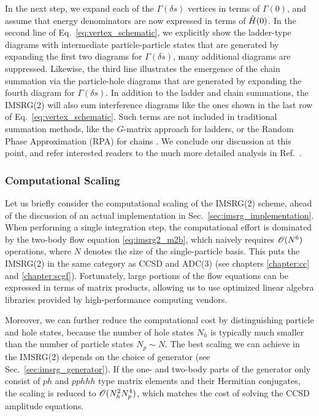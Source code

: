 {In the next step, we expand each of the $\Gamma(\delta s)$ vertices in
terms of $\Gamma(0)$, and assume that energy denominators are now
expressed in terms of $\hat{H}(0)$. In the second line of Eq.~\eqref{eq:vertex_schematic},
we explicitly show the ladder-type diagrams with intermediate 
particle-particle states that are generated by expanding
the first two diagrams for $\Gamma(\delta s)$, many additional diagrams
are suppressed. Likewise, the third line illustrates the emergence of 
the chain summation via the particle-hole diagrams that 
are generated by expanding the fourth diagram for $\Gamma(\delta s)$.
In addition to the ladder and chain summations, the IMSRG(2) will also
sum interference diagrams like the ones shown in the last row of 
Eq.~\eqref{eq:vertex_schematic}.
Such terms are not included in traditional summation methods, like
the $G$-matrix approach for ladders, or the Random Phase Approximation
(RPA) for chains \cite{Day:1967zl,Brandow:1967tg,Fetter:2003ve}. We
conclude our discussion at this point, and refer interested readers
to the much more detailed analysis in Ref.~\cite{Hergert:2016jk}.

%
%
\subsubsection{Computational Scaling}
Let us briefly consider the computational scaling of the IMSRG(2) scheme,
ahead of the discussion of an actual implementation in Sec.~\ref{sec:imsrg_implementation}.
When performing a single integration step, the computational effort is 
dominated by the two-body flow equation \eqref{eq:imsrg2_m2b}, which 
naively requires $\mathcal{O}(N^6)$ operations, where $N$ denotes the size of
the single-particle basis. This puts the IMSRG(2) in the same category 
as CCSD and ADC(3) (see chapters \ref{chapter:cc} and \ref{chapter:scgf}).
Fortunately, large portions of the flow equations can be expressed in 
terms of matrix products, allowing us to use optimized linear algebra 
libraries provided by high-performance computing vendors. 

Moreover, we can further reduce the computational cost by distinguishing 
particle and hole states, because the number of hole states $N_h$ is 
typically much smaller than the number of particle states $N_p\sim N$. 
The best scaling we can achieve in the IMSRG(2) depends on the choice of 
generator (see Sec.~\ref{sec:imsrg_generator}). If the one- and two-body parts of the 
generator only consist of $ph$ and $pphhh$ type matrix elements and their 
Hermitian conjugates, the scaling is reduced to $\mathcal{O}(N_h^2N_p^4)$, 
which matches the cost of solving the CCSD amplitude equations.


}
